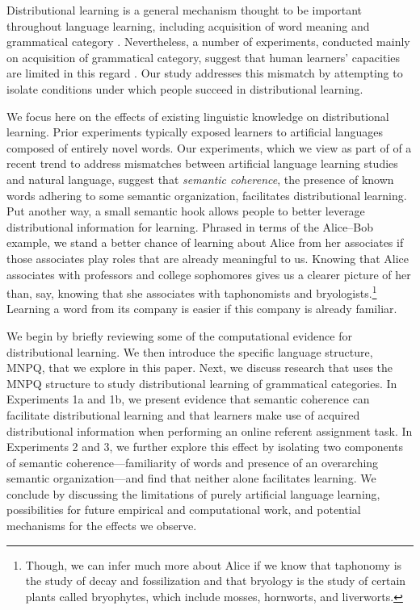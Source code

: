 \documentclass[man,longtable,floatsintext]{my-apa6}
\begin{document}
Distributional learning is a general mechanism thought to be important throughout language learning, including acquisition of word meaning \citep{landauer1997} and grammatical category \citep{redington1998}. Nevertheless, a number of experiments, conducted mainly on acquisition of grammatical category, suggest that human learners' capacities are limited in this regard \citep{braine1987, brooks1993, frigo1998, kempe2001, gerken2005, frank2011}. Our study addresses this mismatch by attempting to isolate conditions under which people succeed in distributional learning.

We focus here on the effects of existing linguistic knowledge on distributional learning. Prior experiments typically exposed learners to artificial languages composed of entirely novel words. Our experiments, which we view as part of  of a recent trend to address mismatches between artificial language learning studies and natural language, suggest that \emph{semantic coherence}, the presence of known words adhering to some semantic organization, facilitates distributional learning. Put another way, a small semantic hook allows people to better leverage distributional information for learning. Phrased in terms of the Alice--Bob example, we stand a better chance of learning about Alice from her associates if those associates play roles that are already meaningful to us. Knowing that Alice associates with professors and college sophomores gives us a clearer picture of her than, say, knowing that she associates with taphonomists and bryologists.\footnote{Though, we can infer much more about Alice if we know that taphonomy is the study of decay and fossilization and that bryology is the study of certain plants called bryophytes, which include mosses, hornworts, and liverworts.} Learning a word from its company is easier if this company is already familiar.

We begin by briefly reviewing some of the computational evidence for distributional learning. We then introduce the specific language structure, MNPQ, that we explore in this paper. Next, we discuss research that uses the MNPQ structure to study distributional learning of grammatical categories. In Experiments 1a and 1b, we present evidence that semantic coherence can facilitate distributional learning and that learners make use of acquired distributional information when performing an online referent assignment task. In Experiments 2 and 3, we further explore this effect by isolating two components of semantic coherence---familiarity of words and presence of an overarching semantic organization---and find that neither alone facilitates learning. We conclude by discussing the limitations of purely artificial language learning, possibilities for future empirical and computational work, and potential mechanisms for the effects we observe.
\end{document}
